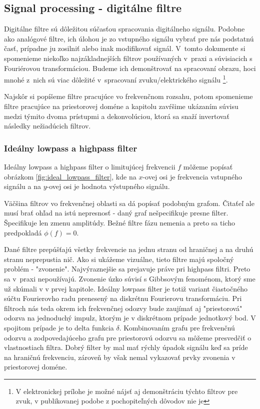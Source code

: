\subsection{Signal processing - digitálne filtre}
Digitálne filtre sú dôležitou súčasťou spracovania digitálneho
signálu. Podobne ako analógové filtre, ich úlohou je zo vstupného
signálu vybrať pre nás podstatnú časť, prípadne ju zosilniť alebo inak
modifikovať signál. V~tomto dokumente si spomenieme niekoľko 
najzákladnejších filtrov používaných v~praxi a súvisiacich s Fouriérovou
transformáciou. Budeme ich demonštrovať na spracovaní obrazu, hoci
mnohé z~nich sú viac dôležité v~spracovaní zvuku/elektrického signálu 
\footnote{V elektronickej prílohe je možné nájsť aj demonštráciu 
týchto filtrov pre zvuk, v publikovanej podobe z pochopiteľných
dôvodov nie je}.

Najskôr si popíšeme filtre pracujúce vo frekvenčnom rozsahu, potom
spomenieme filtre pracujúce na priestorovej doméne a kapitolu
zavŕšime ukázaním súvisu medzi týmito dvoma prístupmi a
dekonvolúciou, ktorá sa snaží invertovať následky nežiadúcich filtrov.

\subsubsection{Ideálny lowpass a highpass filter}
Ideálny lowpass a highpass filter o limitujúcej frekvencii $f$ môžeme
popísať obrázkom \ref{fig:ideal_lowpass_filter}, 
kde na $x$-ovej osi je frekvencia
vstupného signálu a na $y$-ovej osi je hodnota výstupného signálu.
\begin{poznamka}
    Väčšina filtrov vo frekvenčnej oblasti sa dá popísať podobným grafom.
    Čitaťeľ ale musí brať ohľad na istú nepresnosť - daný graf
    nešpecifikuje presne filter. Špecifikuje len zmenu amplitúdy.
    Bežné filtre fázu nemenia a preto sa ticho predpokladá $\phi(f)=0$.
\end{poznamka}

Dané filtre prepúšťajú všetky frekvencie na jednu stranu od hraničnej
a na druhú stranu neprepustia nič. Ako si ukážeme vizuálne, tieto
filtre majú spoločný problém - "zvonenie". Najvýraznejšie sa prejavuje
práve pri highpass filtri. Preto sa v~praxi nepoužívajú.
Zvonenie úzko súvisí s Gibbsovým fenoménom, ktorý sme už skúmali v
v prvej kapitole. Ideálny lowpass filter je totiž variant čiastočného súčtu
Fourierovho radu prenesený na diskrétnu Fourierovu transformáciu. Pri filtroch
nás teda okrem ich frekvenčnej odozvy bude zaujímať aj "priestorová"
odozva na jednoduchý impulz, ktorým je v diskrétnom prípade jednotkový
bod. V
spojitom prípade je to delta funkcia $\delta$. Kombinovaním grafu pre
frekvenčnú odozvu a zodpovedajúceho grafu pre priestorovú odozvu
sa môžeme presvedčiť o vlastnostiach filtra. Dobrý filter by
mal mať rýchly úpadok signálu keď sa príde na hraničnú frekvenciu,
zároveň by však nemal vykazovať prvky zvonenia v priestorovej doméne.

